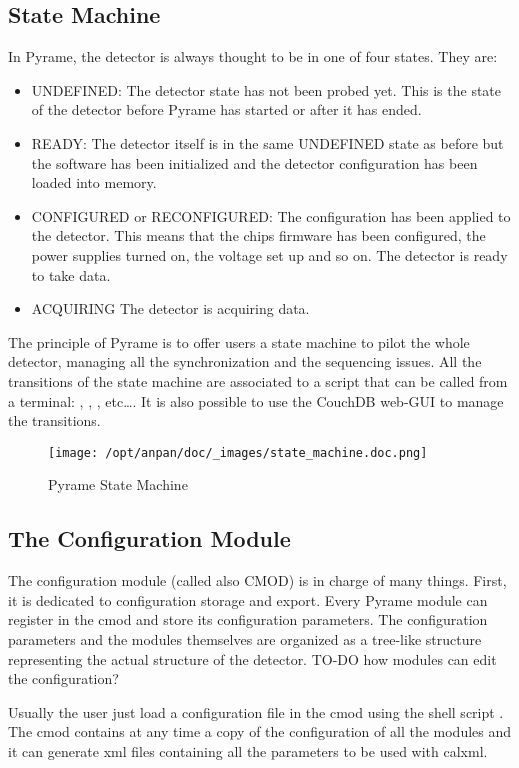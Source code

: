 \subsection{State Machine}
In Pyrame, the detector is always thought to be in one of four
states. They are:
\begin{itemize}
\item UNDEFINED: The detector state has not been probed yet. This is
  the state of the detector before Pyrame has started or after it has
  ended.
\item READY: The detector itself is in the same UNDEFINED state as
  before but the software has been initialized and the detector
  configuration has been loaded into memory.
\item CONFIGURED or RECONFIGURED: The configuration has been applied
  to the detector. This means that the chips firmware has been
  configured, the power supplies turned on, the voltage set up and so
  on. The detector is ready to take data.
\item ACQUIRING The detector is acquiring data.
\end{itemize}
The principle of Pyrame is to offer users a state machine to pilot the
whole detector, managing all the synchronization and the sequencing
issues.  All the transitions of the state machine are associated to a
script that can be called from a terminal:
, ,
, etc\dots. It is also possible to use the
CouchDB web-GUI to manage the transitions.
\begin{figure}
  \texttt{[image: /opt/anpan/doc/\_images/state\_machine.doc.png]}
  \caption{Pyrame State Machine}
  \label{fig:state-machine}
\end{figure}

\subsection{The Configuration Module}
\label{sec:CMOD}

The configuration module (called also CMOD) is in charge of many
things. First, it is dedicated to configuration storage and export.
Every Pyrame module can register in the cmod and store its
configuration parameters. The configuration parameters and the modules
themselves are organized as a tree-like structure representing the
actual structure of the detector.  TO-DO how modules can edit the
configuration?

Usually the user just load a configuration file in the cmod using the
shell script . The cmod
contains at any time a copy of the configuration of all the modules
and it can generate xml files containing all the parameters to be used
with calxml.

